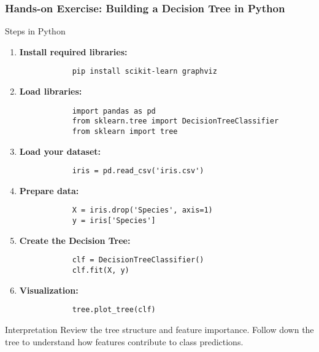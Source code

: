 \documentclass[aspectratio=169]{beamer}
\begin{document}
\begin{frame}[fragile]
    \frametitle{Hands-on Exercise: Building a Decision Tree in Python}
    \begin{block}{Steps in Python}
        \begin{enumerate}
            \item \textbf{Install required libraries:} 
            \begin{lstlisting}
            pip install scikit-learn graphviz
            \end{lstlisting}

            \item \textbf{Load libraries:} 
            \begin{lstlisting}
            import pandas as pd
            from sklearn.tree import DecisionTreeClassifier
            from sklearn import tree
            \end{lstlisting}

            \item \textbf{Load your dataset:} 
            \begin{lstlisting}
            iris = pd.read_csv('iris.csv')
            \end{lstlisting}

            \item \textbf{Prepare data:} 
            \begin{lstlisting}
            X = iris.drop('Species', axis=1)
            y = iris['Species']
            \end{lstlisting}

            \item \textbf{Create the Decision Tree:} 
            \begin{lstlisting}
            clf = DecisionTreeClassifier()
            clf.fit(X, y)
            \end{lstlisting}

            \item \textbf{Visualization:} 
            \begin{lstlisting}
            tree.plot_tree(clf)
            \end{lstlisting}
        \end{enumerate}
    \end{block}

    \begin{block}{Interpretation}
        Review the tree structure and feature importance. Follow down the tree to understand how features contribute to class predictions.
    \end{block}
\end{frame}
\end{document}
